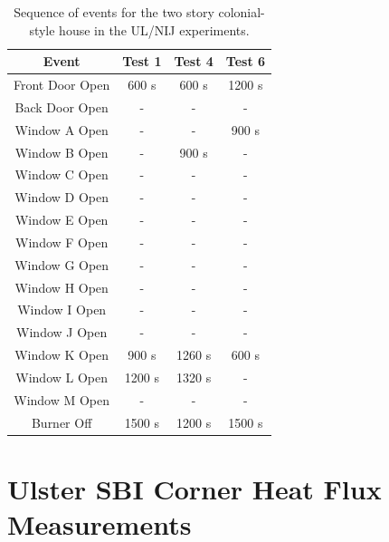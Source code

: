 \begin{table}[ht!]
\begin{center}
\begin{tabular}{|c||c|c|c|}
\hline
Event          & Test 1     & Test 4    & Test 6    \\ \hline \hline
Front Door Open & 600 s    & 600 s    & 1200 s    \\ \hline
Back Door Open  & -       & -       & -       \\ \hline
Window A Open     & -       & -       & 900 s    \\ \hline
Window B Open     & -       & 900 s    & -       \\ \hline
Window C Open     & -       & -       & -       \\ \hline
Window D Open     & -       & -       & -       \\ \hline
Window E Open     & -       & -       & -       \\ \hline
Window F Open     & -       & -       & -       \\ \hline
Window G Open     & -       & -       & -       \\ \hline
Window H Open     & -       & -       & -       \\ \hline
Window I Open     & -       & -       & -       \\ \hline
Window J Open     & -       & -       & -       \\ \hline
Window K Open     & 900 s    & 1260 s    & 600 s    \\ \hline
Window L Open     & 1200 s    & 1320 s    & -       \\ \hline
Window M Open     & -       & -       & -       \\ \hline
Burner Off       & 1500 s    & 1200 s    & 1500 s    \\ \hline
\end{tabular}
\end{center}
\caption[Sequence of events for the two story colonial-style house in the UL/NIJ experiments]
{Sequence of events for the two story colonial-style house in the UL/NIJ experiments.}
\label{Colonial_events}
\end{table}


\FloatBarrier

\section{Ulster SBI Corner Heat Flux Measurements}
\label{Ulster_SBI_Description}

